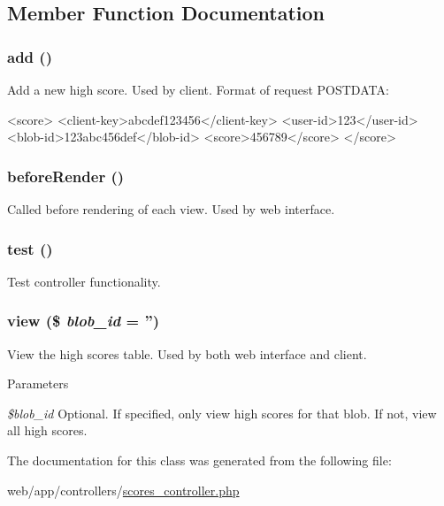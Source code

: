 \subsection{Member Function Documentation}
\hypertarget{class_scores_controller_a837ba24a1c3095ae67613238d866f79a}{
\subsubsection[{add}]{\setlength{\rightskip}{0pt plus 5cm}add ()}}
\label{class_scores_controller_a837ba24a1c3095ae67613238d866f79a}
Add a new high score. Used by client. Format of request POSTDATA: 
\begin{DoxyCode}
 <score>
   <client-key>abcdef123456</client-key>
   <user-id>123</user-id>
   <blob-id>123abc456def</blob-id>
   <score>456789</score>
 </score>
\end{DoxyCode}
 \hypertarget{class_scores_controller_ac89dd29d2229bbc37879d31f95d06e97}{
\subsubsection[{beforeRender}]{\setlength{\rightskip}{0pt plus 5cm}beforeRender ()}}
\label{class_scores_controller_ac89dd29d2229bbc37879d31f95d06e97}
Called before rendering of each view. Used by web interface. \hypertarget{class_scores_controller_ad69dd4607977cae05ebe19d1ae604fb1}{
\subsubsection[{test}]{\setlength{\rightskip}{0pt plus 5cm}test ()}}
\label{class_scores_controller_ad69dd4607977cae05ebe19d1ae604fb1}
Test controller functionality. \hypertarget{class_scores_controller_a82afb1e6c361be60e0ec7e239ea40a93}{
\subsubsection[{view}]{\setlength{\rightskip}{0pt plus 5cm}view (\$ {\em blob\_\-id} = {\ttfamily ''})}}
\label{class_scores_controller_a82afb1e6c361be60e0ec7e239ea40a93}
View the high scores table. Used by both web interface and client. 
\begin{DoxyParams}{Parameters}
\item[{\em \$blob\_\-id}]Optional. If specified, only view high scores for that blob. If not, view all high scores. \end{DoxyParams}


The documentation for this class was generated from the following file:\begin{DoxyCompactItemize}
\item 
web/app/controllers/\hyperlink{scores__controller_8php}{scores\_\-controller.php}\end{DoxyCompactItemize}
